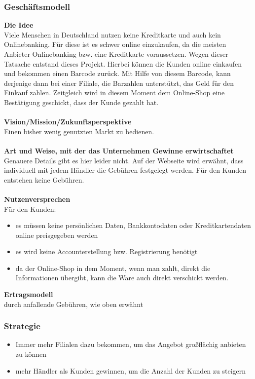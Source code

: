 \subsubsection{Geschäftsmodell}
\textbf{Die Idee}\\
Viele Menschen in Deutschland nutzen keine Kreditkarte und auch kein Onlinebanking. Für diese ist es schwer online 
einzukaufen, da die meisten Anbieter Onlinebanking bzw. eine Kreditkarte voraussetzen. Wegen dieser Tatsache entstand
dieses Projekt. Hierbei können die Kunden online einkaufen und bekommen einen Barcode zurück. Mit Hilfe von diesem
Barcode, kann derjenige dann bei einer Filiale, die Barzahlen unterstützt, das Geld für den Einkauf zahlen. Zeitgleich
wird in diesem Moment dem Online-Shop eine Bestätigung geschickt, dass der Kunde gezahlt hat.\\
\\
\textbf{Vision/Mission/Zukunftsperspektive}\\
Einen bisher wenig genutzten Markt zu bedienen.\\
\\
\textbf{Art und Weise, mit der das Unternehmen Gewinne erwirtschaftet}\\
Genauere Details gibt es hier leider nicht. Auf der Webseite wird erwähnt, dass individuell mit jedem Händler die 
Gebühren festgelegt werden. Für den Kunden entstehen keine Gebühren.\\
\\
\textbf{Nutzenversprechen}\\
Für den Kunden:
\begin{itemize}
\item es müssen keine persönlichen Daten, Bankkontodaten oder Kreditkartendaten online preisgegeben werden
\item es wird keine Accounterstellung bzw. Registrierung benötigt
\item da der Online-Shop in dem Moment, wenn man zahlt, direkt die Informationen übergibt, kann die Ware auch direkt verschickt werden.
\end{itemize}
\textbf{Ertragsmodell}\\
durch anfallende Gebühren, wie oben erwähnt
\subsubsection{Strategie}
\begin{itemize}
\item Immer mehr Filialen dazu bekommen, um das Angebot großflächig anbieten zu können
\item mehr Händler als Kunden gewinnen, um die Anzahl der Kunden zu steigern
\end{itemize}
